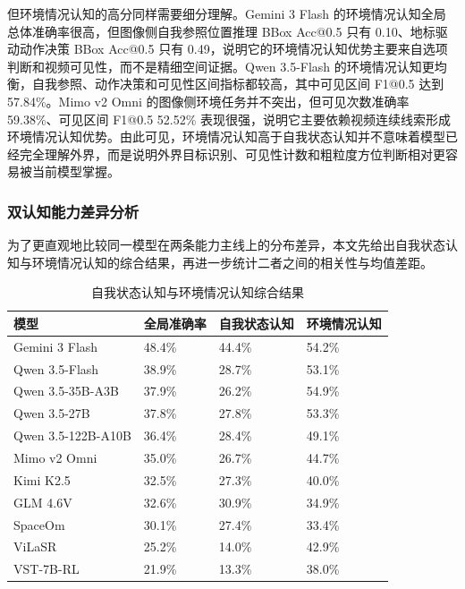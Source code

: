 但环境情况认知的高分同样需要细分理解。Gemini 3 Flash 的环境情况认知全局总体准确率很高，但图像侧自我参照位置推理 BBox Acc@0.5 只有 0.10、地标驱动动作决策 BBox Acc@0.5 只有 0.49，说明它的环境情况认知优势主要来自选项判断和视频可见性，而不是精细空间证据。Qwen 3.5-Flash 的环境情况认知更均衡，自我参照、动作决策和可见性区间指标都较高，其中可见区间 F1@0.5 达到 57.84\%。Mimo v2 Omni 的图像侧环境任务并不突出，但可见次数准确率 59.38\%、可见区间 F1@0.5 52.52\% 表现很强，说明它主要依赖视频连续线索形成环境情况认知优势。由此可见，环境情况认知高于自我状态认知并不意味着模型已经完全理解外界，而是说明外界目标识别、可见性计数和粗粒度方位判断相对更容易被当前模型掌握。

\FloatBarrier
\subsubsection{双认知能力差异分析}

为了更直观地比较同一模型在两条能力主线上的分布差异，本文先给出自我状态认知与环境情况认知的综合结果，再进一步统计二者之间的相关性与均值差距。

\begin{table}[!htbp]
    \centering
    \caption{自我状态认知与环境情况认知综合结果}
    \label{tab:cognition-results}
    \small
    \renewcommand{\arraystretch}{0.95}
    \setlength{\tabcolsep}{5pt}
    \begin{tabularx}{\textwidth}{@{}V{\dimexpr\textwidth-7.9cm-6\tabcolsep\relax}U{2.3cm}U{2.8cm}U{2.8cm}@{}}
        \toprule
        模型 & 全局准确率 & 自我状态认知 & 环境情况认知 \\
        \midrule
        Gemini 3 Flash & 48.4\% & 44.4\% & 54.2\% \\
        Qwen 3.5-Flash & 38.9\% & 28.7\% & 53.1\% \\
        Qwen 3.5-35B-A3B & 37.9\% & 26.2\% & 54.9\% \\
        Qwen 3.5-27B & 37.8\% & 27.8\% & 53.3\% \\
        Qwen 3.5-122B-A10B & 36.4\% & 28.4\% & 49.1\% \\
        Mimo v2 Omni & 35.0\% & 26.7\% & 44.7\% \\
        Kimi K2.5 & 32.5\% & 27.3\% & 40.0\% \\
        GLM 4.6V & 32.6\% & 30.9\% & 34.9\% \\
        SpaceOm & 30.1\% & 27.4\% & 33.4\% \\
        ViLaSR & 25.2\% & 14.0\% & 42.9\% \\
        VST-7B-RL & 21.9\% & 13.3\% & 38.0\% \\
        \bottomrule
    \end{tabularx}
\end{table}

